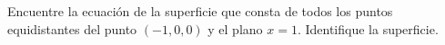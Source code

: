 \item Encuentre la ecuación de la superficie que consta de todos los puntos equidistantes del punto $(-1, 0, 0)$ y el plano $x = 1$. Identifique la superficie.
